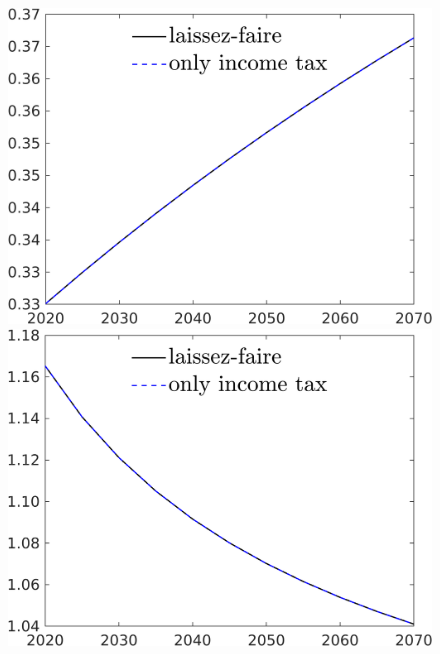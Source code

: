 \begin{figure}[h!!]
\begin{minipage}[]{0.32\textwidth}
	\end{minipage}
\begin{minipage}[]{0.32\textwidth}
	\includegraphics[width=1\textwidth]{../../codding_model/own_basedOnFried/optimalPol_190722_tidiedUp/figures/all_10Aout22/CountTaul_modnsk_target_pf_spillover0_sep1_extern0_PV1_etaa0.79_lgd1.png}
\end{minipage}
\begin{minipage}[]{0.32\textwidth}
	\includegraphics[width=1\textwidth]{../../codding_model/own_basedOnFried/optimalPol_190722_tidiedUp/figures/all_10Aout22/CountTaul_modnsk_target_pg_spillover0_sep1_extern0_PV1_etaa0.79_lgd1.png}
\end{minipage}
\end{figure} 




